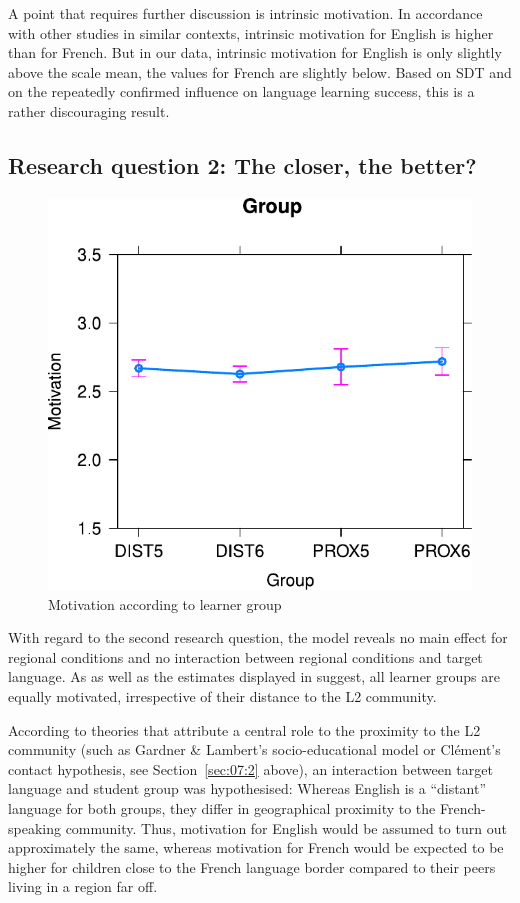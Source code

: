 \documentclass[output=paper]{langsci/langscibook}
\begin{document}
A point that requires further discussion is intrinsic motivation. In accordance with other studies in similar contexts, intrinsic motivation for English is higher than for French. But in our data, intrinsic motivation for English is only slightly above the scale mean, the values for French are slightly below. Based on  SDT and on the repeatedly confirmed influence on language learning success, this is a rather discouraging result.

\subsection{Research question 2: The closer, the better?}\label{sec:07:5.2}

  
\begin{figure}
\includegraphics[width=.5\textwidth]{figures/Fig7.2.pdf}
\caption{Motivation according to learner group\label{fig:07:2}}
\end{figure}

With regard to the second research question, the model reveals no main effect for regional conditions and no interaction between regional conditions and target language. As  as well as the estimates displayed in  suggest, all learner groups are equally motivated, irrespective of their distance to the L2 community.

According to theories that attribute a central role to the proximity to the L2 community (such as Gardner \& Lambert's socio-educational model or Clément's contact hypothesis, see Section~\ref{sec:07:2} above), an interaction between target language and student group was hypothesised: Whereas English is a ``distant'' language for both groups, they differ in geographical proximity to the French-speaking community. Thus, motivation for English would be assumed to turn out approximately the same, whereas motivation for French would be expected to be higher for children close to the French language border compared to their peers living in a region far off.
\end{document}
